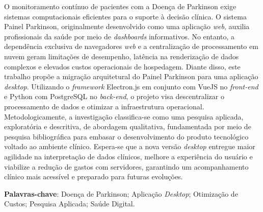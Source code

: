 \begin{resumo}[RESUMO]

    \begin{SingleSpacing}
    
        O monitoramento contínuo de pacientes com a Doença de Parkinson exige sistemas computacionais eficientes para o suporte à decisão clínica. O sistema Painel Parkinson, originalmente desenvolvido como uma aplicação \textit{web}, auxilia profissionais da saúde por meio de \textit{dashboards} informativos. No entanto, a dependência exclusiva de navegadores \textit{web} e a centralização de processamento em nuvem geram limitações de desempenho, latência na renderização de dados complexos e elevados custos operacionais de hospedagem. Diante disso, este trabalho propõe a migração arquitetural do Painel Parkinson para uma aplicação \textit{desktop}. Utilizando o \textit{framework} Electron.js em conjunto com VueJS no \textit{front-end} e Python com PostgreSQL no \textit{back-end}, o projeto visa descentralizar o processamento de dados e otimizar a infraestrutura operacional. Metodologicamente, a investigação classifica-se como uma pesquisa aplicada, exploratória e descritiva, de abordagem qualitativa, fundamentada por meio de pesquisa bibliográfica para embasar o desenvolvimento do produto tecnológico voltado ao ambiente clínico. Espera-se que a nova versão \textit{desktop} entregue maior agilidade na interpretação de dados clínicos, melhore a experiência do usuário e viabilize a redução de gastos com servidores, garantindo um acompanhamento clínico mais acessível e preparado para futuras evoluções.
        
        \textbf{Palavras-chave}: Doença de Parkinson; Aplicação \textit{Desktop}; Otimização de Custos; Pesquisa Aplicada; Saúde Digital.
    
    \end{SingleSpacing}
    
\end{resumo}